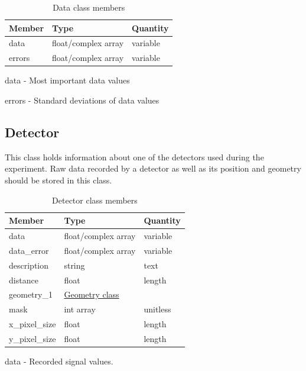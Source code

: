 \documentclass[usletter,11pt]{article}
\newcommand{\member}[2]
{ \noindent
{ \color{softBlue}  #1 - } #2
\vspace{0.2cm}
}
\begin{document}
\begin{table}[h!]\sffamily \footnotesize
\caption{Data class members}

\begin{tabular}{p{4.5cm} p{4.5cm}  p{2.5cm} }
\toprule
\bfseries Member     & \bfseries Type & \bfseries Quantity \\
\midrule
data  & float/complex array & variable  \\
errors  & float/complex array & variable \\
\bottomrule
\end{tabular}
\end{table}

\member{data}{Most important data values}

\member{errors}{Standard deviations of data values}

\subsection{Detector}
\label{table:detector}

This class holds information about one of the detectors used during
the experiment. Raw data recorded by a detector as well as its position
and geometry should be stored in this class.

\begin{table}[h!]\sffamily \footnotesize
\caption{Detector class members}

\begin{tabular}{p{4.5cm} p{4.5cm}  p{2.5cm} }
\toprule
\bfseries Member     & \bfseries Type & \bfseries Quantity \\
\midrule

data     & float/complex array & variable  \\
data\_error & float/complex array & variable \\
description & string & text \\
distance     & float & length\\
geometry\_1 & \hyperref[table:geometry]{Geometry class} & \\
mask & int array & unitless \\
x\_pixel\_size & float & length  \\
y\_pixel\_size & float & length \\
\bottomrule
\end{tabular}
\end{table}

\member{data}{Recorded signal values.}
\end{document}
